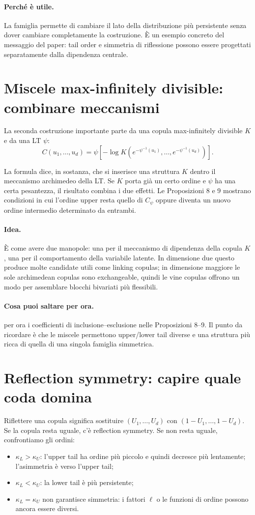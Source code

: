 \documentclass[11pt,a4paper]{article}
\newcommand{\Idea}{\paragraph{Idea.}}
\newcommand{\Salta}{\paragraph{Cosa puoi saltare per ora.}}
\begin{document}
\paragraph{Perché è utile.}
La famiglia permette di cambiare il lato della distribuzione più persistente
senza dover cambiare completamente la costruzione. È un esempio concreto del
messaggio del paper: tail order e simmetria di riflessione possono essere
progettati separatamente dalla dipendenza centrale.

\section{Miscele max-infinitely divisible: combinare meccanismi}

La seconda costruzione importante parte da una copula max-infinitely divisible
$K$ e da una LT $\psi$:
\begin{equation}
 C(u_1,\ldots,u_d)=
 \psi\!\left[-\log K\!\left(e^{-\psi^{-1}(u_1)},\ldots,
 e^{-\psi^{-1}(u_d)}\right)\right].
 \label{eq:maxid-mixture}
\end{equation}

La formula dice, in sostanza, che si inserisce una struttura $K$ dentro il
meccanismo archimedeo della LT. Se $K$ porta già un certo ordine e $\psi$ ha
una certa pesantezza, il risultato combina i due effetti. Le Proposizioni 8 e
9 mostrano condizioni in cui l'ordine upper resta quello di $C_\psi$ oppure
diventa un nuovo ordine intermedio determinato da entrambi.

\Idea È come avere due manopole: una per il meccanismo di dipendenza della
copula $K$, una per il comportamento della variabile latente. In dimensione
due questo produce molte candidate utili come linking copulas; in dimensione
maggiore le sole archimedean copulas sono exchangeable, quindi le vine copulas
offrono un modo per assemblare blocchi bivariati più flessibili.

\Salta per ora i coefficienti di inclusione--esclusione nelle Proposizioni 8--9.
Il punto da ricordare è che le miscele permettono upper/lower tail diverse e
una struttura più ricca di quella di una singola famiglia simmetrica.

\section{Reflection symmetry: capire quale coda domina}

Riflettere una copula significa sostituire $(U_1,\ldots,U_d)$ con
$(1-U_1,\ldots,1-U_d)$. Se la copula resta uguale, c'è reflection symmetry.
Se non resta uguale, confrontiamo gli ordini:
\begin{itemize}[nosep]
  \item $\kappa_L>\kappa_U$: l'upper tail ha ordine più piccolo e quindi
  decresce più lentamente; l'asimmetria è verso l'upper tail;
  \item $\kappa_L<\kappa_U$: la lower tail è più persistente;
  \item $\kappa_L=\kappa_U$ non garantisce simmetria: i fattori $\ell$ o le
  funzioni di ordine possono ancora essere diversi.
\end{itemize}
\end{document}
